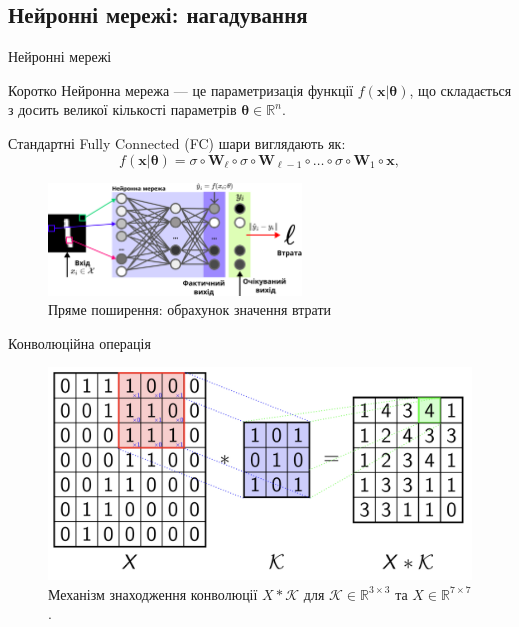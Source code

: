 \documentclass{zkdl-presentation-template}
\begin{document}
    \subsection{Нейронні мережі: нагадування}
    \begin{frame}{Нейронні мережі}
        \begin{block}{Коротко}
            Нейронна мережа --- це параметризація функції
            $f(\boldsymbol{x}|\boldsymbol{\theta})$, що складається з 
            досить великої кількості параметрів $\boldsymbol{\theta} \in \mathbb{R}^n$.
        \end{block}

        \begin{example}
            Стандартні Fully Connected (FC) шари виглядають як:
            \begin{equation*}
                f(\boldsymbol{x}|\boldsymbol{\theta}) = \sigma \circ \boldsymbol{W}_{\ell} \circ \sigma \circ \boldsymbol{W}_{\ell-1} \circ \dots \circ \sigma \circ \boldsymbol{W}_1 \circ \boldsymbol{x},
            \end{equation*}
        \end{example}

        \begin{figure}
            \centering
            \includegraphics[width=0.6\textwidth]{images/full_forward_prop.png}
            \caption{Пряме поширення: обрахунок значення втрати}
        \end{figure}
    \end{frame}

    \begin{frame}{Конволюційна операція}
        \begin{figure}
            \centering
            \includegraphics[width=\textwidth]{images/convolution.png}
            \caption{Механізм знаходження конволюції $X*\mathcal{K}$ для $\mathcal{K} \in \mathbb{R}^{3 \times 3}$ та $X \in \mathbb{R}^{7 \times 7}$.}
        \end{figure}
    \end{frame}
\end{document}
